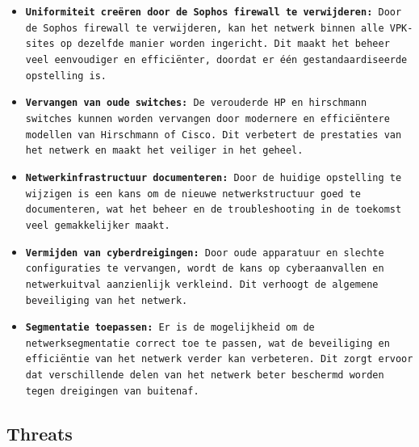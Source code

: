 \begin{itemize}
\item \texttt{\textbf{Uniformiteit creëren door de Sophos firewall te verwijderen:} Door de Sophos firewall te verwijderen, kan het netwerk binnen alle VPK-sites op dezelfde manier worden ingericht. Dit maakt het beheer veel eenvoudiger en efficiënter, doordat er één gestandaardiseerde opstelling is.}

\item \texttt{\textbf{Vervangen van oude switches:} De verouderde HP en hirschmann switches kunnen worden vervangen door modernere en efficiëntere modellen van Hirschmann of Cisco. Dit verbetert de prestaties van het netwerk en maakt het veiliger in het geheel.}

\item \texttt{\textbf{Netwerkinfrastructuur documenteren:} Door de huidige opstelling te wijzigen is een kans om de nieuwe netwerkstructuur goed te documenteren, wat het beheer en de troubleshooting in de toekomst veel gemakkelijker maakt.}

\item \texttt{\textbf{Vermijden van cyberdreigingen:} Door oude apparatuur en slechte configuraties te vervangen, wordt de kans op cyberaanvallen en netwerkuitval aanzienlijk verkleind. Dit verhoogt de algemene beveiliging van het netwerk.}

\item \texttt{\textbf{Segmentatie toepassen:} Er is de mogelijkheid om de netwerksegmentatie correct toe te passen, wat de beveiliging en efficiëntie van het netwerk verder kan verbeteren. Dit zorgt ervoor dat verschillende delen van het netwerk beter beschermd worden tegen dreigingen van buitenaf.}

\end{itemize}


\subsection{Threats}

